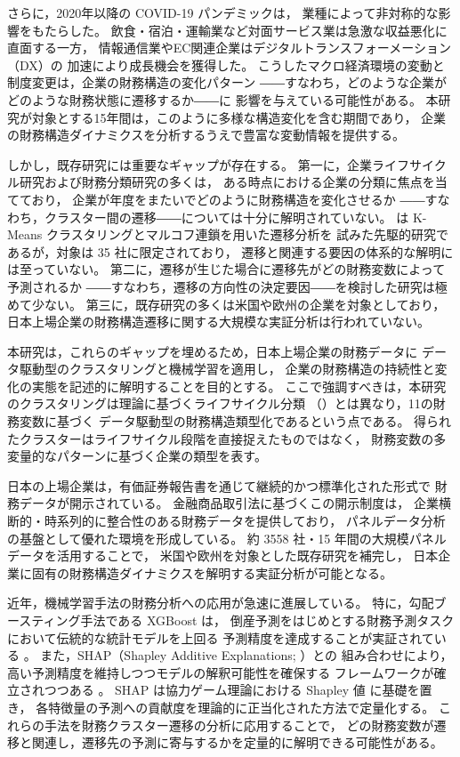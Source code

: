 さらに，2020年以降の COVID-19 パンデミックは，
業種によって非対称的な影響をもたらした。
飲食・宿泊・運輸業など対面サービス業は急激な収益悪化に直面する一方，
情報通信業やEC関連企業はデジタルトランスフォーメーション（DX）の
加速により成長機会を獲得した。
こうしたマクロ経済環境の変動と制度変更は，企業の財務構造の変化パターン
――すなわち，どのような企業がどのような財務状態に遷移するか――に
影響を与えている可能性がある。
本研究が対象とする15年間は，このように多様な構造変化を含む期間であり，
企業の財務構造ダイナミクスを分析するうえで豊富な変動情報を提供する。

しかし，既存研究には重要なギャップが存在する。
第一に，企業ライフサイクル研究および財務分類研究の多くは，
ある時点における企業の分類に焦点を当てており，
企業が年度をまたいでどのように財務構造を変化させるか
――すなわち，クラスター間の遷移――については十分に解明されていない。
 は K-Means クラスタリングとマルコフ連鎖を用いた遷移分析を
試みた先駆的研究であるが，対象は 35 社に限定されており，
遷移と関連する要因の体系的な解明には至っていない。
第二に，遷移が生じた場合に遷移先がどの財務変数によって予測されるか
――すなわち，遷移の方向性の決定要因――を検討した研究は極めて少ない。
第三に，既存研究の多くは米国や欧州の企業を対象としており，
日本上場企業の財務構造遷移に関する大規模な実証分析は行われていない。

本研究は，これらのギャップを埋めるため，日本上場企業の財務データに
データ駆動型のクラスタリングと機械学習を適用し，
企業の財務構造の持続性と変化の実態を記述的に解明することを目的とする。
ここで強調すべきは，本研究のクラスタリングは理論に基づくライフサイクル分類
（\citealt{Dickinson2011}）とは異なり，11の財務変数に基づく
データ駆動型の財務構造類型化であるという点である。
得られたクラスターはライフサイクル段階を直接捉えたものではなく，
財務変数の多変量的なパターンに基づく企業の類型を表す。

日本の上場企業は，有価証券報告書を通じて継続的かつ標準化された形式で
財務データが開示されている。
金融商品取引法に基づくこの開示制度は，
企業横断的・時系列的に整合性のある財務データを提供しており，
パネルデータ分析の基盤として優れた環境を形成している。
約 \num{3558} 社・15 年間の大規模パネルデータを活用することで，
米国や欧州を対象とした既存研究を補完し，
日本企業に固有の財務構造ダイナミクスを解明する実証分析が可能となる。

近年，機械学習手法の財務分析への応用が急速に進展している。
特に，勾配ブースティング手法である XGBoost \citep{ChenGuestrin2016} は，
倒産予測をはじめとする財務予測タスクにおいて伝統的な統計モデルを上回る
予測精度を達成することが実証されている \citep{Nguyen2023, BenJabeur2023}。
また，SHAP（Shapley Additive Explanations; \citealt{LundbergLee2017}）との
組み合わせにより，高い予測精度を維持しつつモデルの解釈可能性を確保する
フレームワークが確立されつつある \citep{Zhang2023}。
SHAP は協力ゲーム理論における Shapley 値 \citep{Shapley1953} に基礎を置き，
各特徴量の予測への貢献度を理論的に正当化された方法で定量化する。
これらの手法を財務クラスター遷移の分析に応用することで，
どの財務変数が遷移と関連し，遷移先の予測に寄与するかを定量的に解明できる可能性がある。

